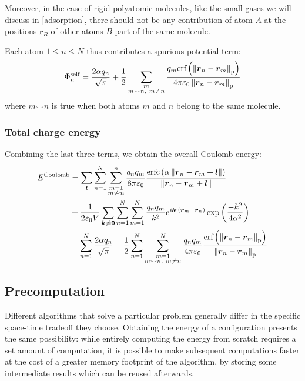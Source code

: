 \documentclass[main.tex]{subfiles}
\begin{document}
Moreover, in the case of rigid polyatomic molecules, like the small gases we will discuss in \cref{adsorption}, there should not be any contribution of atom $A$ at the positions $\boldsymbol r_B$ of other atoms $B$ part of the same molecule.

Each atom $1\le n\le N$ thus contributes a spurious potential term:
\[\Phi^\text{self}_n = \frac{2\alpha q_n}{\sqrt\pi} + \frac12\sum_{\substack{m\\m\smile n,\ m\not\kern0.2ex= n}}\frac{q_m\text{erf}\left(\left\|\boldsymbol r_n - \boldsymbol r_m\right\|_\text{p}\right)}{4\pi\varepsilon_0\left\|\boldsymbol r_n - \boldsymbol r_m\right\|_\text{p}}\]
where $m\smile n$ is true when both atoms $m$ and $n$ belong to the same molecule.

\subsubsection{Total charge energy}

Combining the last three terms, we obtain the overall Coulomb energy:
\[\begin{split}
E^\text{Coulomb} &= \sum_{\boldsymbol l} \sum_{n=1}^N\sum_{\substack{m=1\\m\not\smile n}}^n \frac{q_n q_m}{8\pi\varepsilon_0}\frac{\text{erfc}\left(\alpha\left\|\boldsymbol r_n - \boldsymbol r_m + \boldsymbol l\right\|\right)}{\left\|\boldsymbol r_n - \boldsymbol r_m + \boldsymbol l\right\|}
\\&+ \frac1{2\varepsilon_0V} \sum_{\boldsymbol{k}\not\kern0.2ex=\boldsymbol{0}}\sum_{n=1}^N\sum_{m=1}^N \frac{q_n q_m}{k^2}e^{i\boldsymbol k\cdot\left(\boldsymbol r_m - \boldsymbol r_n\right)}\exp\left(\frac{-k^2}{4\alpha^2}\right)
\\&- \sum_{n=1}^N\frac{2\alpha q_n}{\sqrt\pi} - \frac12\sum_{n=1}^N\sum_{\substack{m=1\\m\smile n,\ m\not\kern0.2ex= n}}^N \frac{q_n q_m}{4\pi\varepsilon_0}\frac{\text{erf}\left(\left\|\boldsymbol r_n - \boldsymbol r_m\right\|_\text{p}\right)}{\left\|\boldsymbol r_n - \boldsymbol r_m\right\|_\text{p}}
\end{split}\]

\subsection{Precomputation}

Different algorithms that solve a particular problem generally differ in the specific space-time tradeoff they choose. Obtaining the energy of a configuration presents the same possibility: while entirely computing the energy from scratch requires a set amount of computation, it is possible to make subsequent computations faster at the cost of a greater memory footprint of the algorithm, by storing some intermediate results which can be reused afterwards.
\end{document}
